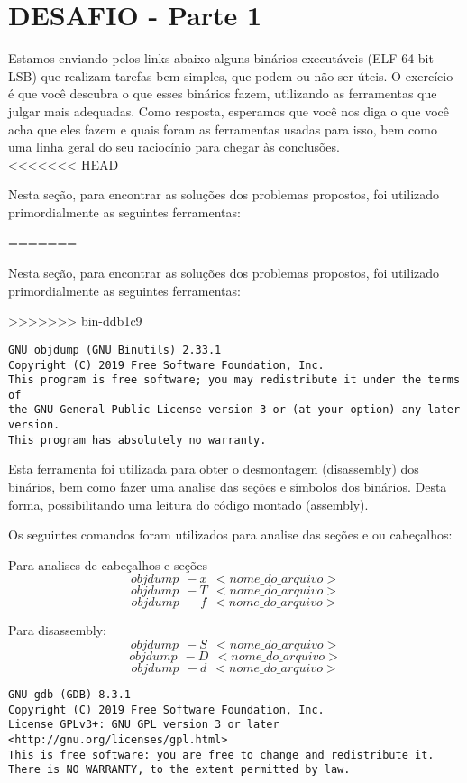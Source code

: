 \section{DESAFIO - Parte 1} \label{sec:desafio1}

Estamos enviando pelos links abaixo alguns binários executáveis (ELF
64-bit LSB) que realizam tarefas bem simples, que podem ou não ser
úteis. O exercício é que você descubra o que esses binários fazem,
utilizando as ferramentas que julgar mais adequadas. Como resposta,
esperamos que você nos diga o que você acha que eles fazem e quais
foram as ferramentas usadas para isso, bem como uma linha geral do seu
raciocínio para chegar às conclusões.\\
<<<<<<< HEAD

\par Nesta seção, para encontrar as soluções dos problemas propostos, foi
utilizado primordialmente as seguintes ferramentas:

=======

\par Nesta seção, para encontrar as soluções dos problemas propostos, foi
utilizado primordialmente as seguintes ferramentas:

>>>>>>> bin-ddb1c9
\begin{verbatim}
GNU objdump (GNU Binutils) 2.33.1
Copyright (C) 2019 Free Software Foundation, Inc.
This program is free software; you may redistribute it under the terms of
the GNU General Public License version 3 or (at your option) any later version.
This program has absolutely no warranty.
\end{verbatim}

Esta ferramenta foi utilizada para obter o desmontagem (disassembly)
dos binários, bem como fazer uma analise das seções e símbolos dos
binários. Desta forma, possibilitando uma leitura do código montado
(assembly).

Os seguintes comandos foram utilizados para analise das seções e ou
cabeçalhos:

Para analises de cabeçalhos e seções\\
$$objdump \ \ -x \ \ <nome\_do\_arquivo>$$
$$objdump \ \ -T \ \ <nome\_do\_arquivo>$$
$$objdump \ \ -f \ \ <nome\_do\_arquivo>$$

Para disassembly:\\
$$objdump \ \ -S \ \ <nome\_do\_arquivo>$$
$$objdump \ \ -D \ \ <nome\_do\_arquivo>$$
$$objdump \ \ -d \ \ <nome\_do\_arquivo>$$

\begin{verbatim}
GNU gdb (GDB) 8.3.1
Copyright (C) 2019 Free Software Foundation, Inc.
License GPLv3+: GNU GPL version 3 or later <http://gnu.org/licenses/gpl.html>
This is free software: you are free to change and redistribute it.
There is NO WARRANTY, to the extent permitted by law.
\end{verbatim}

